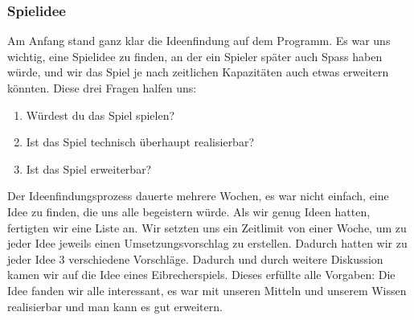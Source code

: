 \documentclass[12pt,a4paper]{scrartcl}
\begin{document}
\subsubsection{Spielidee}
Am Anfang stand ganz klar die Ideenfindung auf dem Programm. Es war uns wichtig,
eine Spielidee zu finden, an der ein Spieler später auch Spass haben würde,
und wir das Spiel je nach zeitlichen Kapazitäten auch etwas erweitern könnten.
Diese drei Fragen halfen uns:
\begin{enumerate}
\item Würdest du das Spiel spielen?
\item Ist das Spiel technisch überhaupt realisierbar?
\item Ist das Spiel erweiterbar?
\end{enumerate}
Der Ideenfindungsprozess dauerte mehrere Wochen, es war nicht einfach, eine Idee
zu finden, die uns alle begeistern würde. 
Als wir genug Ideen hatten, fertigten wir eine Liste an. 
Wir setzten uns ein Zeitlimit von einer Woche, um zu jeder Idee jeweils einen Umsetzungsvorschlag zu erstellen. 
Dadurch hatten wir zu jeder Idee 3 verschiedene Vorschläge.
Dadurch und durch weitere Diskussion kamen wir auf die Idee eines Eibrecherspiels.
Dieses erfüllte alle Vorgaben:
Die Idee fanden wir alle interessant, es war mit unseren Mitteln und unserem Wissen realisierbar und man kann es gut erweitern.
\end{document}
